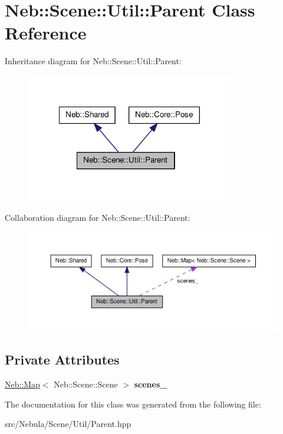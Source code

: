 \hypertarget{classNeb_1_1Scene_1_1Util_1_1Parent}{\section{\-Neb\-:\-:\-Scene\-:\-:\-Util\-:\-:\-Parent \-Class \-Reference}
\label{classNeb_1_1Scene_1_1Util_1_1Parent}
}


\-Inheritance diagram for \-Neb\-:\-:\-Scene\-:\-:\-Util\-:\-:\-Parent\-:
\nopagebreak
\begin{figure}[H]
\begin{center}
\leavevmode
\includegraphics[width=258pt]{classNeb_1_1Scene_1_1Util_1_1Parent__inherit__graph}
\end{center}
\end{figure}


\-Collaboration diagram for \-Neb\-:\-:\-Scene\-:\-:\-Util\-:\-:\-Parent\-:
\nopagebreak
\begin{figure}[H]
\begin{center}
\leavevmode
\includegraphics[width=350pt]{classNeb_1_1Scene_1_1Util_1_1Parent__coll__graph}
\end{center}
\end{figure}
\subsection*{\-Private \-Attributes}
\begin{DoxyCompactItemize}
\item 
\hypertarget{classNeb_1_1Scene_1_1Util_1_1Parent_a06bece1fce87446527a42b8e585abe19}{\hyperlink{classNeb_1_1Map}{\-Neb\-::\-Map}$<$ \-Neb\-::\-Scene\-::\-Scene $>$ {\bfseries scenes\-\_\-}}\label{classNeb_1_1Scene_1_1Util_1_1Parent_a06bece1fce87446527a42b8e585abe19}

\end{DoxyCompactItemize}


\-The documentation for this class was generated from the following file\-:\begin{DoxyCompactItemize}
\item 
src/\-Nebula/\-Scene/\-Util/\-Parent.\-hpp\end{DoxyCompactItemize}
